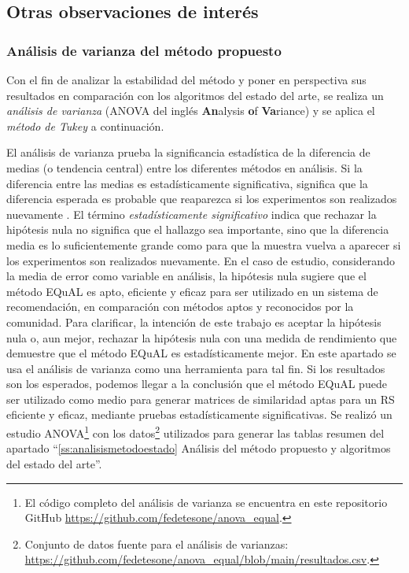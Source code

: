 \subsection{Otras observaciones de interés}

\subsubsection{Análisis de varianza del método propuesto}

Con el fin de analizar la estabilidad del método y poner en perspectiva sus resultados en comparación con los algoritmos del estado del arte, se realiza un \textit{análisis de varianza} (ANOVA del inglés \textbf{An}alysis \textbf{o}f \textbf{Va}riance) y se aplica el \textit{método de Tukey} a continuación.

\bigskip El análisis de varianza prueba la significancia estadística de la diferencia de medias (o tendencia central) entre los diferentes métodos en análisis. Si la diferencia entre las medias es estadísticamente significativa, significa que la diferencia esperada es probable que reaparezca si los experimentos son realizados nuevamente \citep{tabachnick2007experimental}. El término \textit{estadísticamente significativo} indica que rechazar la hipótesis nula no significa que el hallazgo sea importante, sino que la diferencia media es lo suficientemente grande como para que la muestra vuelva a aparecer si los experimentos son realizados nuevamente. En el caso de estudio, considerando la media de error como variable en análisis, la hipótesis nula sugiere que el método EQuAL es apto, eficiente y eficaz para ser utilizado en un sistema de recomendación, en comparación con métodos aptos y reconocidos por la comunidad. Para clarificar, la intención de este trabajo es aceptar la hipótesis nula o, aun mejor, rechazar la hipótesis nula con una medida de rendimiento que demuestre que el método EQuAL es estadísticamente mejor. En este apartado se usa el análisis de varianza como una herramienta para tal fin. Si los resultados son los esperados, podemos llegar a la conclusión que el método EQuAL puede ser utilizado como medio para generar matrices de similaridad aptas para un RS eficiente y eficaz, mediante pruebas estadísticamente significativas. Se realizó un estudio ANOVA\footnote{El código completo del análisis de varianza se encuentra en este repositorio GitHub \url{https://github.com/fedetesone/anova_equal}.} con los datos\footnote{Conjunto de datos fuente para el análisis de varianzas: \url{https://github.com/fedetesone/anova_equal/blob/main/resultados.csv}.} utilizados para generar las tablas resumen del apartado “\ref{ss:analisismetodoestado} Análisis del método propuesto y algoritmos del estado del arte”.

